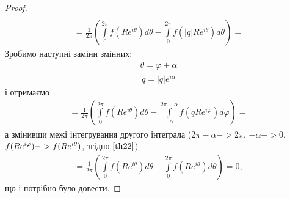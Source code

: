 \documentclass[12pt,a4paper]{article}
\begin{document}
\begin{proof}
\[\begin{array}{l}
\end{array} \] 
\[\begin{array}{l}
= \frac{1}{2\pi}(\int\limits_{0}^{2\pi} f(Re^{i\theta})d\theta  - \int\limits_{0}^{2\pi}f(\left |q \right |Re^{i\theta })d\theta) = 
\end{array} \]
Зробимо наступні заміни змінних:
\begin{equation}\label{th22}
\begin{array}{l}
\theta =\varphi +\alpha 
\end{array} 
\end{equation}
\begin{equation}\label{th23}
\begin{array}{l}
q=\left |q  \right |e^{i\alpha }
\end{array} 
\end{equation}
і отримаємо
\[\begin{array}{l}
= \frac{1}{2\pi}(\int\limits_{0}^{2\pi} f(Re^{i\theta})d\theta  - \int\limits_{-\alpha}^{2\pi-\alpha}f(qRe^{i\varphi })d\varphi)=
\end{array} \]
а змінивши межі інтегрування другого інтеграла ($2\pi-\alpha->2\pi$, $ -\alpha->0$, $ \\
f(Re^{i\varphi})->f(Re^{i\theta})$, згідно $\eqref {th22} $)
\[\begin{array}{l}
=\frac{1}{2\pi}(\int\limits_{0}^{2\pi} f(Re^{i\theta})d\theta - \int\limits_{0}^{2\pi}f(Re^{i\theta })d\theta)=0,
\end{array}\]
що і потрібно було довести.
\end{proof}
\[\begin{array}{l}
\end{array} \]
\end{document}
